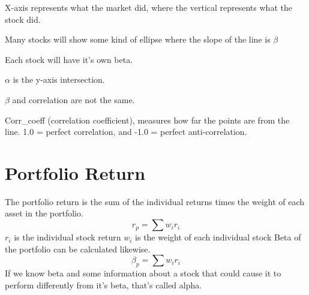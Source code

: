 \documentclass{article}
\begin{document}
    X-axis represents what the market did, where the vertical represents what the stock did.

    Many stocks will show some kind of ellipse where the slope of the line is $\beta$

    Each stock will have it's own beta.

    $\alpha$ is the y-axis intersection.

    $\beta$ and correlation are not the same.

    Corr\_coeff (correlation coefficient), measures how far the points are from the line. 1.0 = perfect correlation, and -1.0 = perfect anti-correlation.


    \section{Portfolio Return}
    The portfolio return is the sum of the individual returns times the weight of each asset in the portfolio.
    $$r_p=\sum{w_ir_i}$$
    $r_i$ is the individual stock return
    $w_i$ is the weight of each individual stock
    Beta of the portfolio can be calculated likewise.
    $$\beta_p = \sum{w_ir_i}$$
    If we know beta and some information about a stock that could cause it to perform differently from it's beta, that's called alpha.
    
\end{document}
